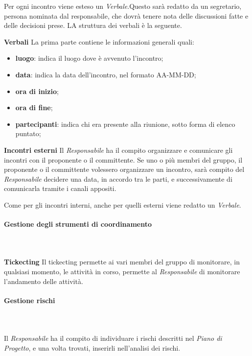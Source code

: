    					Per ogni incontro viene esteso un \textit{Verbale}.Questo sarà redatto da un segretario, persona nominata dal responsabile, che dovrà tenere nota delle discussioni fatte e delle decisioni prese. LA struttura dei verbali è la seguente.
   					
   				\textbf{Verbali}
   				La prima parte contiene le informazioni generali quali:
   				\begin{itemize}
   					\item \textbf{luogo}: indica il luogo dove è avvenuto l'incontro;
   					\item \textbf{data}: indica la data dell'incontro, nel formato AA-MM-DD;
   					\item \textbf{ora di inizio};
   					\item \textbf{ora di fine};
   					\item \textbf{partecipanti}: indica chi era presente alla riunione, sotto forma di elenco puntato;
   				\end{itemize}
	   			\textbf{Incontri esterni}\newline \newline
   					Il \textit{Responsabile} ha il compito organizzare e comunicare gli incontri con il proponente o il committente. Se uno o più membri del gruppo, il proponente o il committente volessero organizzare un incontro, sarà compito del \textit{Responsabile} decidere una data, in accordo tra le parti, e successivamente di comunicarla tramite i canali appositi.
   					
   					Come per gli incontri interni, anche per quelli esterni viene redatto un \textit{Verbale}.
   			\paragraph{Gestione degli strumenti di coordinamento} \mbox{}\\ \mbox{}\\
   				\textbf{Tickecting} \newline \newline
   					Il tickecting permette ai vari membri del gruppo di monitorare, in qualsiasi momento, le attività in corso, permette al \textit{Responsabile} di monitorare l'andamento delle attività.
   			\paragraph{Gestione rischi}\mbox{}\\ \mbox{}\\
   				Il \textit{Responsabile} ha il compito di individuare i rischi descritti nel \textit{Piano di Progetto}, e una volta trovati, inserirli nell'analisi dei rischi.
   				
